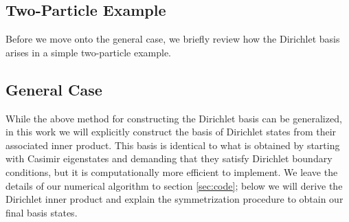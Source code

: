 \subsection{Two-Particle Example} Before we move onto the general case, we briefly review how the Dirichlet basis arises in a simple two-particle example.

\subsection{General Case} While the above method for constructing the Dirichlet basis can be generalized, in this work we will explicitly construct the basis of Dirichlet states from their associated inner product. This basis is identical to what is obtained by starting with Casimir eigenstates and demanding that they satisfy Dirichlet boundary conditions, but it is computationally more efficient to implement. We leave the details of our numerical algorithm to section \ref{sec:code}; below we will derive the Dirichlet inner product and explain the symmetrization procedure to obtain our final basis states.

